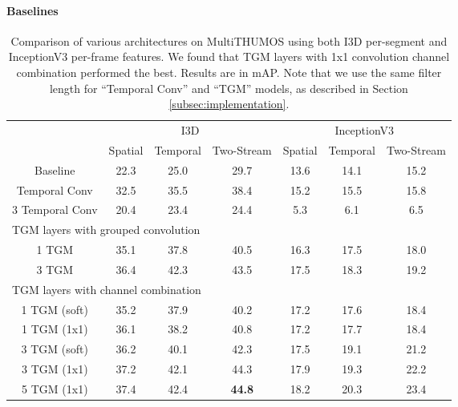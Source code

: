 \documentclass{article}
\begin{document}
\paragraph{Baselines}
\begin{table*}[t]
    \centering
    \caption{Comparison of various architectures on MultiTHUMOS using both I3D per-segment and InceptionV3 per-frame features. We found that TGM layers with 1x1 convolution channel combination performed the best. Results are in mAP. Note that we use the same filter length for ``Temporal Conv'' and ``TGM'' models, as described in Section \ref{subsec:implementation}.}
    \small \begin{tabular}{c|ccc||ccc}
        \toprule
                         &  \multicolumn{3}{c||}{I3D} & \multicolumn{3}{c}{InceptionV3}\\
                         & Spatial  & Temporal  & Two-Stream  & Spatial & Temporal & Two-Stream \\
        \midrule
        Baseline         & 22.3 & 25.0 & 29.7      & 13.6 & 14.1 & 15.2 \\
Temporal Conv    & 32.5 & 35.5 & 38.4      & 15.2 & 15.5 & 15.8 \\
        3 Temporal Conv  & 20.4 & 23.4 & 24.4      &  5.3 &  6.1 & 6.5 \\
        \midrule
        \multicolumn{7}{l}{TGM layers with grouped convolution}\\
        \midrule
        1 TGM            & 35.1 & 37.8 & 40.5      & 16.3 & 17.5 & 18.0 \\
3 TGM            & 36.4 & 42.3 & 43.5 & 17.5 & 18.3 & 19.2 \\  
\midrule
        \multicolumn{7}{l}{TGM layers with channel combination}\\
        \midrule
        1 TGM (soft)   & 35.2 & 37.9 & 40.2     & 17.2 & 17.6 & 18.4 \\
        1 TGM (1x1)    & 36.1 & 38.2 & 40.8     & 17.2 & 17.7 & 18.4 \\
        3 TGM (soft)   & 36.2 & 40.1 & 42.3     & 17.5 & 19.1 & 21.2 \\
        3 TGM (1x1)    & 37.2 & 42.1 & 44.3     & 17.9 & 19.3 & 22.2 \\
        5 TGM (1x1)    & 37.4 & 42.4 & \textbf{44.8}     & 18.2 & 20.3 & 23.4 \\
\bottomrule
    \end{tabular}
    \label{tab:multithumos-results}
\end{table*}
\end{document}
